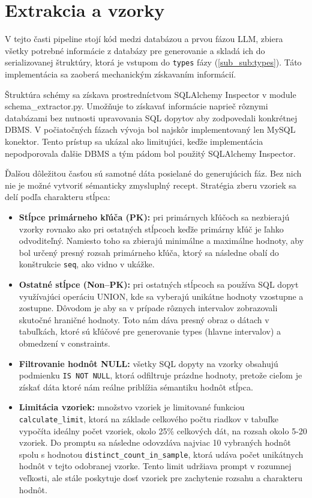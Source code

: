 \section{Extrakcia a vzorky}
\label{sub:extrakcia_a_vzorky}

V tejto časti pipeline stojí kód medzi databázou a prvou fázou LLM, zbiera všetky potrebné informácie z databázy pre generovanie a skladá ich do serializovanej štruktúry, ktorá je vstupom do \texttt{types} fázy (\ref{sub_sub:types}). Táto implementácia  sa zaoberá mechanickým získavaním informácií.


Štruktúra schémy sa získava prostredníctvom SQLAlchemy Inspector v module \newline schema\_extractor.py. Umožňuje to získavať informácie naprieč rôznymi databázami bez nutnosti upravovania SQL dopytov aby zodpovedali konkrétnej {DBMS}. V počiatočných fázach vývoja bol najskôr implementovaný len MySQL konektor. Tento prístup sa ukázal ako limitujúci, keďže implementácia nepodporovala ďalšie {DBMS} a tým pádom bol použitý SQLAlchemy Inspector.


Ďalšou dôležitou časťou sú samotné dáta posielané do generujúcich fáz. Bez nich nie je možné vytvoriť sémanticky zmysluplný recept. Stratégia zberu vzoriek sa delí podľa charakteru stĺpca:

\begin{itemize}
    \item \textbf{Stĺpce primárneho kľúča (PK):} pri primárnych kľúčoch sa nezbierajú vzorky rovnako ako pri ostatných stĺpcoch keďže primárny kľúč je ľahko odvoditeľný. Namiesto toho sa zbierajú minimálne a maximálne hodnoty, aby bol určený presný rozsah primárneho kľúča, ktorý sa následne obalí do konštrukcie \texttt{seq}, ako vidno v ukážke. 
    \item \textbf{Ostatné stĺpce (Non–PK):} pri ostatných stĺpcoch sa používa SQL dopyt využívajúci operáciu UNION, kde sa vyberajú unikátne hodnoty vzostupne a zostupne. Dôvodom je aby sa v prípade rôznych intervalov zobrazovali skutočné hraničné hodnoty. Toto nám dáva presný obraz o dátach v tabuľkách, ktoré sú kľúčové pre generovanie types (hlavne intervalov) a obmedzení v constraints.
    \item \textbf{Filtrovanie hodnôt NULL:} všetky SQL dopyty na vzorky obsahujú podmienku \texttt{IS NOT NULL}, ktorá odfiltruje prázdne hodnoty, pretože cieľom je získať dáta ktoré nám reálne priblížia sémantiku hodnôt stĺpca.
    \item \textbf{Limitácia vzoriek:} množstvo vzoriek je limitované funkciou \texttt{calculate\_limit}, ktorá na základe celkového počtu riadkov v tabuľke vypočíta ideálny počet vzoriek, okolo 25\% celkových dát, na rozsah okolo 5-20 vzoriek. Do promptu sa následne odovzdáva najviac 10 vybraných hodnôt spolu s hodnotou \texttt{distinct\_count\_in\_sample}, ktorá udáva počet unikátnych hodnôt v tejto odobranej vzorke. Tento limit udržiava prompt v rozumnej veľkosti, ale stále poskytuje dosť vzoriek pre zachytenie rozsahu a charakteru hodnôt.
\end{itemize}

